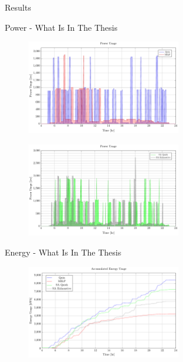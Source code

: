 \documentclass[aspectratio=169]{beamer}
\begin{document}
\begin{frame}[label={sec:org4ee59dd}]{Results}
\begin{frame}[label={sec:orgda8cd91}]{Power - What Is In The Thesis}
\begin{figure}[htpb]
\centering
    \includegraphics[width=0.6\textwidth]{img/sa-pap-paper-bad/power-milp-qin}
\end{figure}
\begin{figure}[htpb]
\centering
    \includegraphics[width=0.6\textwidth]{img/sa-pap-paper-bad/power-sa}
\end{figure}
\end{frame}
\begin{frame}[label={sec:org38002e6}]{Energy - What Is In The Thesis}
\begin{figure}[htpb]
\centering
    \includegraphics[width=0.6\textwidth]{img/sa-pap-paper-bad/energy}
\end{figure}
\end{frame}


\end{frame}
\end{document}

